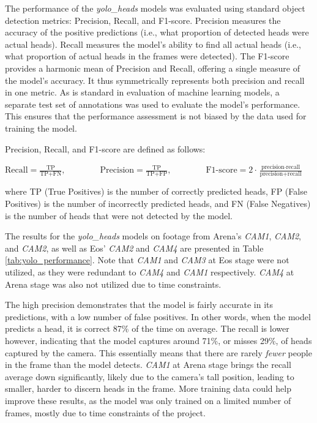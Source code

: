 The performance of the \textit{yolo\_heads} models was evaluated using standard object detection metrics: Precision, Recall, and F1-score. Precision measures the accuracy of the positive predictions (i.e., what proportion of detected heads were actual heads). Recall measures the model's ability to find all actual heads (i.e., what proportion of actual heads in the frames were detected). The F1-score provides a harmonic mean of Precision and Recall, offering a single measure of the model's accuracy. It thus symmetrically represents both precision and recall in one metric. As is standard in evaluation of machine learning models, a separate test set of annotations was used to evaluate the model's performance. This ensures that the performance assessment is not biased by the data used for training the model. \newpage

Precision, Recall, and F1-score are defined as follows:

\begin{center}
  \centering
  $\text{Recall} = \frac{\text{TP}}{\text{TP} + \text{FN}}, \qquad
    \qquad  \text{Precision} = \frac{\text{TP}}{\text{TP} + \text{FP}}, \qquad
    \qquad  \text{F1-score} = 2\cdot \frac{\text{precision} \cdot \text{recall}}{\text{precision} + \text{recall}}$
\end{center}

where TP (True Positives) is the number of correctly predicted heads, FP (False Positives) is the number of incorrectly predicted heads, and FN (False Negatives) is the number of heads that were not detected by the model.

The results for the \textit{yolo\_heads} models on footage from Arena's \textit{CAM1}, \textit{CAM2}, and \textit{CAM2}, as well as Eos' \textit{CAM2} and \textit{CAM4} are presented in Table \ref{tab:yolo_performance}. Note that \textit{CAM1} and \textit{CAM3} at Eos stage were not utilized, as they were redundant to \textit{CAM4} and \textit{CAM1} respectively. \textit{CAM4} at Arena stage was also not utilized due to time constraints.

The high precision demonstrates that the model is fairly accurate in its predictions, with a low number of false positives. In other words, when the model predicts a head, it is correct 87\% of the time on average. The recall is lower however, indicating that the model captures around 71\%, or misses 29\%, of heads captured by the camera. This essentially means that there are rarely \textit{fewer} people in the frame than the model detects. \textit{CAM1} at Arena stage brings the recall average down significantly, likely due to the camera's tall position, leading to smaller, harder to discern heads in the frame. More training data could help improve these results, as the model was only trained on a limited number of frames, mostly due to time constraints of the project.

